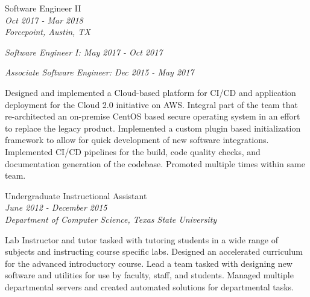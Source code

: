 \documentclass[10pt]{article} %
\begin{document}
\begin{minipage}[t]{0.5\textwidth}
{
\raggedright\large  Software Engineer II\\
\small \textit{Oct 2017 - Mar 2018}\\
\small \textit{Forcepoint, Austin, TX}\\
\raggedright\small \textit{Software Engineer I: May 2017 - Oct 2017}\\
\raggedright\small \textit{Associate Software Engineer: Dec 2015 - May 2017}\\
[5pt]
}

\normalsize{Designed and implemented a Cloud-based platform for CI/CD and application deployment for the Cloud 2.0 initiative on AWS. Integral part of the team that re-architected an on-premise CentOS based secure operating system in an effort to replace the legacy product. Implemented a custom plugin based initialization framework to allow for quick development of new software integrations. Implemented CI/CD pipelines for the build, code quality checks, and documentation generation of the codebase. Promoted multiple times within same team.}\\

{\raggedright\large Undergraduate Instructional Assistant\\
\small \textit{June 2012 - December 2015} \\
\small \textit{Department of Computer Science, Texas State University}\\[5pt]}

\normalsize{Lab Instructor and tutor tasked with tutoring students in a wide range of subjects and instructing course specific labs. Designed an accelerated curriculum for the advanced introductory course. Lead a team tasked with designing new software and utilities for use by faculty, staff, and students. Managed multiple departmental servers and created automated solutions for departmental tasks.}\\

\end{minipage}
\hfill
\end{document}
